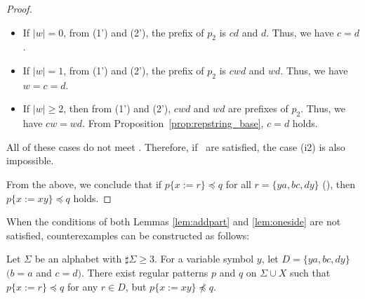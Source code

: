 \begin{proof}
\begin{itemize}
\item If $|w|=0$, from (1') and (2'), the prefix of $p_{2}$ is $cd$ and $d$. Thus, we have $c=d$.
\item If $|w|=1$, from (1') and (2'), the prefix of $p_{2}$ is $cwd$ and $wd$. Thus, we have $w=c=d$.
\item If $|w| \ge 2$, then from (1') and (2'), $cwd$ and $wd$ are prefixes of $p_{2}$. Thus, we have $cw=wd$. From Proposition~\ref{prop:repstring_base}, $c=d$ holds.
\end{itemize}
All of these cases do not meet \TheConditionB.
Therefore, if \TheConditionB\ are satisfied, the case (i2) is also impossible.

From the above, we conclude that if $p \{ x := r \} \preceq q$ for all $r = \{ ya, bc, dy \}$ (\TheConditionB), then $p \{ x := xy \} \preceq q$ holds.
\end{proof}

When the conditions of both Lemmas \ref{lem:addpart} and \ref{lem:oneside} are not satisfied, counterexamples can be constructed as follows:

\begin{prop}\label{prop:bothsides}
  Let $\Sigma$ be an alphabet with $\sharp \Sigma \ge 3$.
  For a variable symbol $y$, let $D= \{ ya, bc, dy \}$ $(b = a$ and $c = d)$.
  There exist regular patterns $p$ and $q$ on $\Sigma\cup X$ such that $p \{ x := r \} \preceq q$ for any $r \in D$, but $p \{ x := xy \} \not \preceq q$.
\end{prop}

